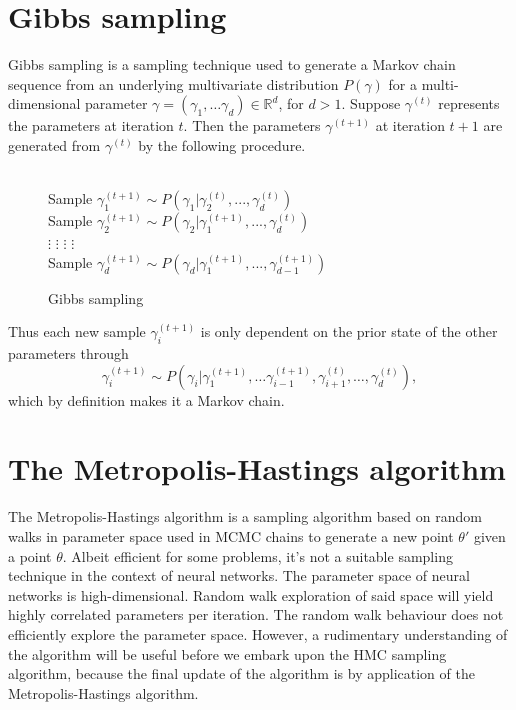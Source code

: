 \section{Gibbs sampling}
Gibbs sampling \cite{gibbs} is a sampling technique used to generate a Markov chain sequence from an underlying multivariate distribution $P(\gamma)$ for a multi-dimensional parameter $\gamma = (\gamma_1, \ldots \gamma_d) \in \mathbb{R}^d$, for $d > 1$.
Suppose $\gamma^{(t)}$ represents the parameters at iteration $t$. Then the parameters $\gamma^{(t+1)}$ at iteration $t+1$ are generated from $\gamma^{(t)}$ by the following procedure.
\begin{figure}[H]
  \begin{algorithm}[H]
    \caption{Gibbs sampling}
    \begin{algorithmic}
      \\
        \State Sample $\gamma^{(t+1)}_1 \sim P(\gamma_1|\gamma_2^{(t)},...,\gamma_d^{(t)})$ \\
        \State Sample $\gamma^{(t+1)}_2 \sim P(\gamma_2|\gamma_1^{(t+1)},...,\gamma_d^{(t)})$\\
        \State $\vdots$ \qquad  \qquad $\vdots$ \qquad  \qquad $\vdots$ \qquad \qquad $\vdots$\\
        \State Sample $\gamma^{(t+1)}_d \sim P(\gamma_d|\gamma_1^{(t+1)},...,\gamma_{d-1}^{(t+1)})$\\
      \EndProcedure
    \end{algorithmic}
  \end{algorithm}
\end{figure}
\noindent Thus each new sample $\gamma^{(t+1)}_i$ is only dependent on the prior state of the other parameters through
\begin{equation}
  \gamma_i^{(t+1)} \sim P(\gamma_i|\gamma_{1}^{(t+1)}, \ldots \gamma_{i-1}^{(t+1)}, \gamma_{i+1}^{(t)}, \ldots, \gamma_{d}^{(t)}),
\end{equation}
which by definition makes it a Markov chain.


\section{The Metropolis-Hastings algorithm}
The Metropolis-Hastings algorithm \cite{metropolis} is a sampling algorithm based on random walks in parameter space used in MCMC chains to generate a new point $\theta'$ given a point $\theta$. Albeit efficient for some
problems, it's not a suitable sampling technique in the context of neural networks. 
The parameter space of neural networks is high-dimensional. Random walk exploration of said space will
yield highly correlated parameters per iteration. The random walk behaviour does not efficiently explore the parameter space.
However, a rudimentary understanding of the algorithm will be useful before we embark upon the HMC sampling algorithm, 
because the final update of the algorithm is by application of the Metropolis-Hastings algorithm.

